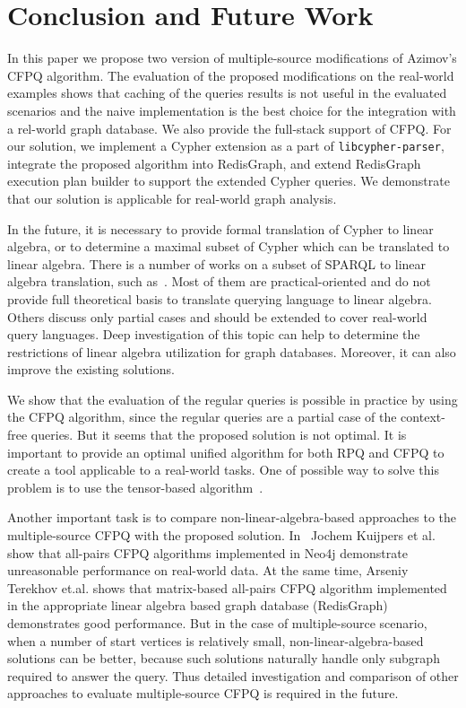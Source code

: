 \section{Conclusion and Future Work}
In this paper we propose two version of multiple-source modifications of Azimov's CFPQ algorithm.
The evaluation of the proposed modifications on the real-world examples shows that caching of the queries results is not useful in the evaluated scenarios and the naive implementation is the best choice for the integration with a rel-world graph database.
We also provide the full-stack support of CFPQ.
For our solution, we implement a Cypher extension as a part of \texttt{libcypher-parser}, integrate the proposed algorithm into RedisGraph, and extend RedisGraph execution plan builder to support the extended Cypher queries.
We demonstrate that our solution is applicable for real-world graph analysis.

In the future, it is necessary to provide formal translation of Cypher to linear algebra, or to determine a maximal subset of Cypher which can be translated to linear algebra.
There is a number of works on a subset of SPARQL to linear algebra translation, such as~\cite{10.14778/3229863.3236239,10.1007/978-3-642-34002-4_36,10.1145/3302424.3303962,DBLP:journals/corr/MetzlerM15a}.
Most of them are practical-oriented and do not provide full theoretical basis to translate querying language to linear algebra.
Others discuss only partial cases and should be extended to cover real-world query languages.
Deep investigation of this topic can help to determine the restrictions of linear algebra utilization for graph databases.
Moreover, it can also improve the existing solutions.

We show that the evaluation of the regular queries is possible in practice by using the CFPQ algorithm, since the regular queries are a partial case of the context-free queries.
But it seems that the proposed solution is not optimal.
It is important to provide an optimal unified algorithm for both RPQ and CFPQ to create a tool applicable to a real-world tasks.
One of possible way to solve this problem is to use the tensor-based algorithm~\cite{10.1007/978-3-030-54832-2_6}.

Another important task is to compare non-linear-algebra-based approaches to the multiple-source CFPQ with the proposed solution.
In~\cite{Kuijpers:2019:ESC:3335783.3335791} Jochem Kuijpers et al. show that all-pairs CFPQ algorithms implemented in Neo4j demonstrate unreasonable performance on real-world data.
At the same time, Arseniy Terekhov et.al. shows that matrix-based all-pairs CFPQ algorithm implemented in the appropriate linear algebra based graph database (RedisGraph) demonstrates good performance.
But in the case of multiple-source scenario, when a number of start vertices is relatively small, non-linear-algebra-based solutions can be better, because such solutions naturally handle only subgraph required to answer the query.
Thus detailed investigation and comparison of other approaches to evaluate multiple-source CFPQ is required in the future.